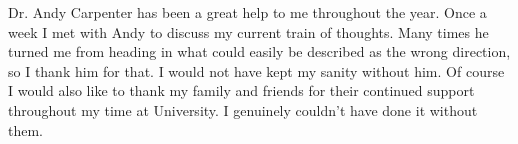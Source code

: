 Dr. Andy Carpenter has been a great help to me throughout the year. Once a week I met with Andy to discuss my current train of thoughts. Many times he turned me from heading in what could easily be described as the wrong direction, so I thank him for that. I would not have kept my sanity without him.
Of course I would also like to thank my family and friends for their continued support throughout my time at University. I genuinely couldn't have done it without them.